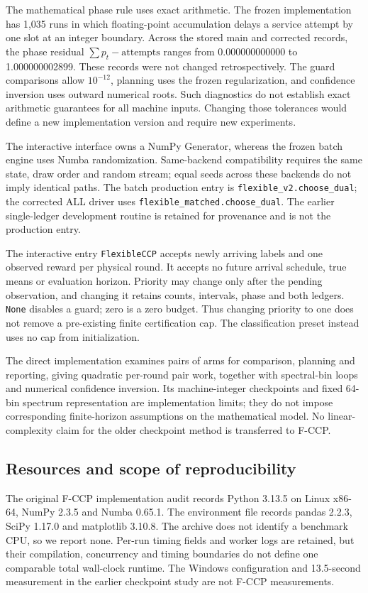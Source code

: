 \documentclass[11pt]{article}
\theoremstyle{remark}
\begin{document}
The mathematical phase rule uses exact arithmetic. The frozen implementation has 1,035 runs in which floating-point accumulation delays a service attempt by one slot at an integer boundary. Across the stored main and corrected records, the phase residual $\sum p_t-\mathrm{attempts}$ ranges from 0.000000000000 to 1.000000002899. These records were not changed retrospectively. The guard comparisons allow $10^{-12}$, planning uses the frozen regularization, and confidence inversion uses outward numerical roots. Such diagnostics do not establish exact arithmetic guarantees for all machine inputs. Changing those tolerances would define a new implementation version and require new experiments.

The interactive interface owns a NumPy Generator, whereas the frozen batch engine uses Numba randomization. Same-backend compatibility requires the same state, draw order and random stream; equal seeds across these backends do not imply identical paths. The batch production entry is \texttt{flexible\_v2.choose\_dual}; the corrected ALL driver uses \texttt{flexible\_matched.choose\_dual}. The earlier single-ledger development routine is retained for provenance and is not the production entry.

The interactive entry \texttt{FlexibleCCP} accepts newly arriving labels and one observed reward per physical round. It accepts no future arrival schedule, true means or evaluation horizon. Priority may change only after the pending observation, and changing it retains counts, intervals, phase and both ledgers. \texttt{None} disables a guard; zero is a zero budget. Thus changing priority to one does not remove a pre-existing finite certification cap. The classification preset instead uses no cap from initialization.

The direct implementation examines pairs of arms for comparison, planning and reporting, giving quadratic per-round pair work, together with spectral-bin loops and numerical confidence inversion. Its machine-integer checkpoints and fixed 64-bin spectrum representation are implementation limits; they do not impose corresponding finite-horizon assumptions on the mathematical model. No linear-complexity claim for the older checkpoint method is transferred to F-CCP.

\subsection{Resources and scope of reproducibility}
The original F-CCP implementation audit records Python 3.13.5 on Linux x86-64, NumPy 2.3.5 and Numba 0.65.1. The environment file records pandas 2.2.3, SciPy 1.17.0 and matplotlib 3.10.8. The archive does not identify a benchmark CPU, so we report none. Per-run timing fields and worker logs are retained, but their compilation, concurrency and timing boundaries do not define one comparable total wall-clock runtime. The Windows configuration and 13.5-second measurement in the earlier checkpoint study are not F-CCP measurements.
\end{document}
